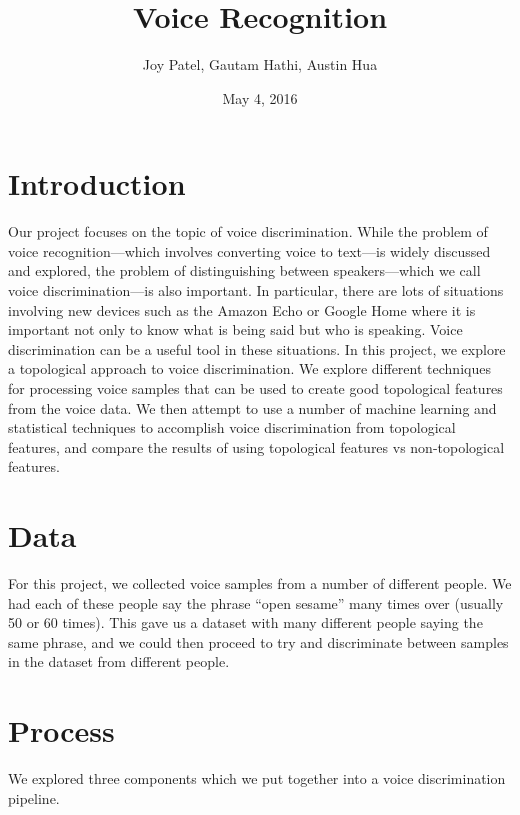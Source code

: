 \documentclass[12pt]{article}
\title{Voice Recognition}
\author{Joy Patel, Gautam Hathi, Austin Hua}
\date{May 4, 2016}
\begin{document}
\maketitle
\newpage

\section{Introduction}
\-\hspace{1cm} Our project focuses on the topic of voice discrimination. While
the problem of voice recognition—which involves converting voice to text—is widely discussed
and explored, the problem of distinguishing between speakers—which we call
voice discrimination—is also important. In particular, there are lots of
situations involving new devices such as the Amazon Echo or Google Home where
it is important not only to know what is being said but who is speaking. Voice
discrimination can be a useful tool in these situations.
\newline \-\hspace{1cm}In this project, we explore a topological approach to
voice discrimination. We explore different techniques for processing voice
samples that can be used to create good topological features from the voice
data. We then attempt to use a number of machine learning and statistical
techniques to accomplish voice discrimination from topological features, and
compare the results of using topological features vs non-topological features.

\section{Data}
\-\hspace{1cm} For this project, we collected voice samples from a number of
different people. We had each of these people say the phrase “open sesame” many
times over (usually 50 or 60 times). This gave us a dataset with many different
people saying the same phrase, and we could then proceed to try and
discriminate between samples in the dataset from different people.

\section{Process}
\-\hspace{1cm} We explored three components which we put together into a voice
discrimination pipeline.
\end{document}
